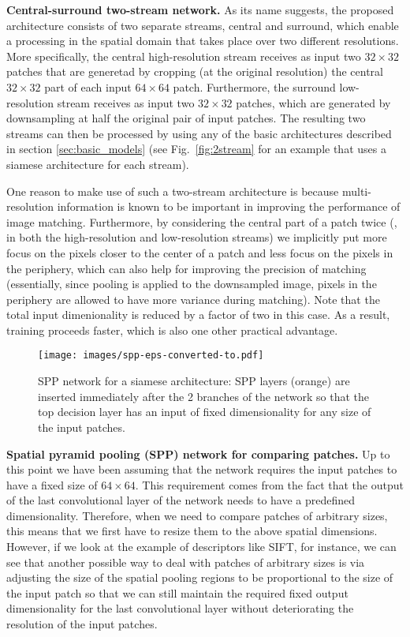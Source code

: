 \documentclass[10pt,twocolumn,letterpaper]{article}
\newcommand*{\USEIMAGES}{}
\begin{document}
\textbf{Central-surround two-stream network.} As its name suggests, the proposed architecture consists of two separate streams, central and surround, which enable a processing in the spatial domain that takes place  over two different resolutions. More specifically, the central high-resolution stream receives as input two  $32\times 32$ patches that are generetad by cropping (at the original resolution) the central $32\times 32$ part of each input $64\times 64$ patch.
Furthermore, the surround low-resolution stream receives as input two   $32\times 32$ patches, which  are generated by downsampling
at half the original pair of input patches. The resulting two streams can then be processed by  using any of the basic architectures described in section \ref{sec:basic_models} (see Fig.~\ref{fig:2stream} for an example that uses a siamese architecture for each stream). 

One reason to make use of such a two-stream architecture is because multi-resolution information is  known to be important in improving the performance of image matching. Furthermore, by considering  the central part of a patch twice
(\ie, in both the high-resolution
and  low-resolution streams) we implicitly put more focus on the pixels closer to the center of a patch and less focus on the pixels in the periphery, which can also help for improving the precision of matching
(essentially, since  pooling is applied to the downsampled image,   pixels in the periphery are allowed to have more variance during matching). Note that  the total input dimenionality is  reduced by a factor of two in this case.
As a result, training  proceeds  faster, which is also one other practical advantage. 

\ifdefined\USEIMAGES
\begin{figure}
\small
\begin{center}
\texttt{[image: images/spp-eps-converted-to.pdf]}
\end{center}
\vspace{-5pt}
\caption{SPP network for a siamese architecture:  SPP layers (orange) are inserted immediately after the 2 branches of the network so that  the top decision layer has an input of  fixed dimensionality for any size of the input patches.}
\small
\label{fig:spp}
\vspace{-15pt}
\end{figure}
\fi
\textbf{Spatial pyramid pooling (SPP) network for comparing patches.}\label{sec:spp} Up to this point we have been assuming that the network requires the input patches to have a fixed size of $64\times 64$. This requirement comes from the fact that the output of the last convolutional layer of the network needs to have a predefined dimensionality. Therefore, when we need to compare patches of arbitrary sizes, this means that we first have to resize them to the above spatial dimensions. However, if we look at the example of descriptors like SIFT, for instance, we can see that another possible way to deal with patches of arbitrary sizes is via   adjusting  the size of the spatial pooling regions to be proportional to the size of the input patch so that we can still maintain the required fixed output dimensionality for the last convolutional layer without deteriorating the resolution of the input patches. %
\end{document}
